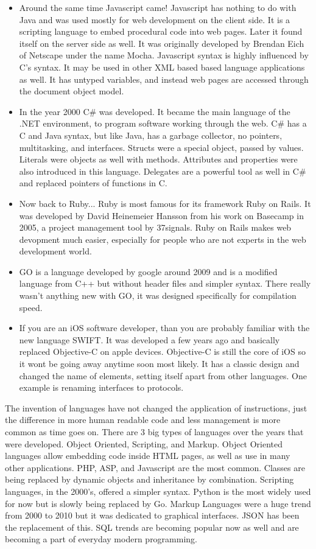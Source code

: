 \documentclass[letterpaper, 10 pt, conference]{IEEEtran}
\begin{document}
\begin{itemize}
\item Around the same time Javascript came! Javascript has nothing to do with Java and was used mostly for web development on the client side. It is a scripting language to embed procedural code into web pages. Later it found itself on the server side as well. It was originally developed by Brendan Eich of Netscape under the name Mocha. Javascript syntax is highly influenced by C's syntax. It may be used in other XML based based language applications as well. It has untyped variables, and instead web pages are accessed through the document object model.  \bigskip
\item In the year 2000 C\# was developed. It became the main language of the .NET environment, to program software working through the web. C\# has a C and Java syntax, but like Java, has a garbage collector, no pointers, multitasking, and interfaces. Structs were a special object, passed by values. Literals were objects as well with methods. Attributes and properties were also introduced in this language. Delegates are a powerful tool as well in C\# and replaced pointers of functions in C. \bigskip
\item Now back to Ruby... Ruby is most famous for its framework Ruby on Rails. It was developed by David Heinemeier Hansson from his work on Basecamp in 2005, a project management tool by 37signals. Ruby on Rails makes web devopment much easier, especially for people who are not experts in the web development world. \bigskip
\item GO is a language developed by google around 2009 and is a modified language from C++ but without header files and simpler syntax. There really wasn't anything new with GO, it was designed specifically for compilation speed. \bigskip
\item If you are an iOS software developer, than you are probably familiar with the new language SWIFT. It was developed a few years ago and basically replaced Objective-C on apple devices. Objective-C is still the core of iOS so it wont be going away anytime soon most likely. It has a classic design and changed the name of elements, setting itself apart from other languages. One example is renaming interfaces to protocols.
\bigskip
\end{itemize}
\indent The invention of languages have not changed the application of instructions, just the difference in more human readable code and less management is more common as time goes on. There are 3 big types of languages over the years that were developed. Object Oriented, Scripting, and Markup. Object Oriented languages allow embedding code inside HTML pages, as well as use in many other applications. PHP, ASP, and Javascript are the most common. Classes are being replaced by dynamic objects and inheritance by combination. Scripting languages, in the 2000's, offered a simpler syntax. Python is the most widely used for now but is slowly being replaced by Go. Markup Languages were a huge trend from 2000 to 2010 but it was dedicated to graphical interfaces. JSON has been the replacement of this. SQL trends are becoming popular now as well and are becoming a part of everyday modern programming.
\end{document}
